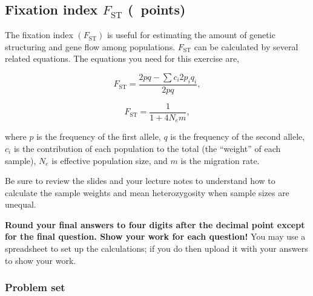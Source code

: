 \documentclass[12pt, addpoints, hidelinks]{exam}
\newcommand{\fst}{$F_{\mathrm{ST}}$}
\begin{document}

\subsection*{Fixation index \fst{} (\numpoints\ points)}

The fixation index $(F_\mathrm{ST})$ is useful for estimating the amount of genetic structuring and gene flow among populations. \fst{} can be calculated by several related equations. The equations you need for this exercise are,
\begin{multicols}{2}
\noindent	
\begin{equation}
F_\mathrm{ST} = \dfrac{2pq-\sum c_i2p_iq_i}{2pq},
\end{equation}

	
	\columnbreak
	
\noindent	
\begin{equation}
F_\mathrm{ST} = \dfrac{1}{1+4N_em},
\end{equation}%
\end{multicols}

where $p$ is the frequency of the first allele, $q$ is the frequency of the second allele, $c_i$ is the contribution of each population to the total (the “weight” of each sample), $N_e$ is effective population size, and $m$ is the migration rate.

Be sure to review the slides and your lecture notes to understand how to calculate the sample weights and mean heterozygosity when sample sizes are unequal.

\textbf{Round your final answers to four digits after the decimal point except for the final question. Show your work for each question!} You may use a spreadsheet to set up the calculations; if you do then upload it with your answers to show your work.

\subsubsection*{Problem set}
\end{document}
